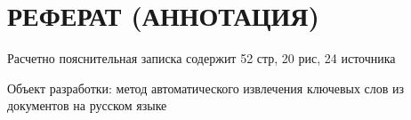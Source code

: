 \chapter*{РЕФЕРАТ (АННОТАЦИЯ)}
Расчетно пояснительная записка содержит 52 стр, 20 рис, 24 источника

Объект разработки: метод автоматического извлечения ключевых слов из документов на русском языке